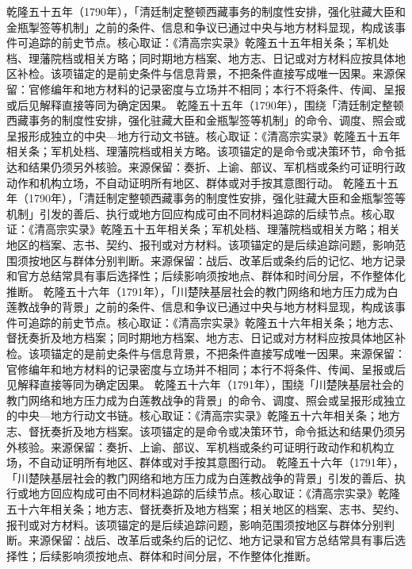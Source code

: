 乾隆五十五年（1790年），「清廷制定整顿西藏事务的制度性安排，强化驻藏大臣和金瓶掣签等机制」之前的条件、信息和争议已通过中央与地方材料显现，构成该事件可追踪的前史节点。核心取证：《清高宗实录》乾隆五十五年相关条；军机处档、理藩院档或相关方略；同时期地方档案、地方志、日记或对方材料应按具体地区补检。该项锚定的是前史条件与信息背景，不把条件直接写成唯一因果。来源保留：官修编年和地方材料的记录密度与立场并不相同；本行不将条件、传闻、呈报或后见解释直接等同为确定因果。
乾隆五十五年（1790年），围绕「清廷制定整顿西藏事务的制度性安排，强化驻藏大臣和金瓶掣签等机制」的命令、调度、照会或呈报形成独立的中央—地方行动文书链。核心取证：《清高宗实录》乾隆五十五年相关条；军机处档、理藩院档或相关方略。该项锚定的是命令或决策环节，命令抵达和结果仍须另外核验。来源保留：奏折、上谕、部议、军机档或条约可证明行政动作和机构立场，不自动证明所有地区、群体或对手按其意图行动。
乾隆五十五年（1790年），「清廷制定整顿西藏事务的制度性安排，强化驻藏大臣和金瓶掣签等机制」引发的善后、执行或地方回应构成可由不同材料追踪的后续节点。核心取证：《清高宗实录》乾隆五十五年相关条；军机处档、理藩院档或相关方略；相关地区的档案、志书、契约、报刊或对方材料。该项锚定的是后续追踪问题，影响范围须按地区与群体分别判断。来源保留：战后、改革后或条约后的记忆、地方记录和官方总结常具有事后选择性；后续影响须按地点、群体和时间分层，不作整体化推断。
乾隆五十六年（1791年），「川楚陕基层社会的教门网络和地方压力成为白莲教战争的背景」之前的条件、信息和争议已通过中央与地方材料显现，构成该事件可追踪的前史节点。核心取证：《清高宗实录》乾隆五十六年相关条；地方志、督抚奏折及地方档案；同时期地方档案、地方志、日记或对方材料应按具体地区补检。该项锚定的是前史条件与信息背景，不把条件直接写成唯一因果。来源保留：官修编年和地方材料的记录密度与立场并不相同；本行不将条件、传闻、呈报或后见解释直接等同为确定因果。
乾隆五十六年（1791年），围绕「川楚陕基层社会的教门网络和地方压力成为白莲教战争的背景」的命令、调度、照会或呈报形成独立的中央—地方行动文书链。核心取证：《清高宗实录》乾隆五十六年相关条；地方志、督抚奏折及地方档案。该项锚定的是命令或决策环节，命令抵达和结果仍须另外核验。来源保留：奏折、上谕、部议、军机档或条约可证明行政动作和机构立场，不自动证明所有地区、群体或对手按其意图行动。
乾隆五十六年（1791年），「川楚陕基层社会的教门网络和地方压力成为白莲教战争的背景」引发的善后、执行或地方回应构成可由不同材料追踪的后续节点。核心取证：《清高宗实录》乾隆五十六年相关条；地方志、督抚奏折及地方档案；相关地区的档案、志书、契约、报刊或对方材料。该项锚定的是后续追踪问题，影响范围须按地区与群体分别判断。来源保留：战后、改革后或条约后的记忆、地方记录和官方总结常具有事后选择性；后续影响须按地点、群体和时间分层，不作整体化推断。
